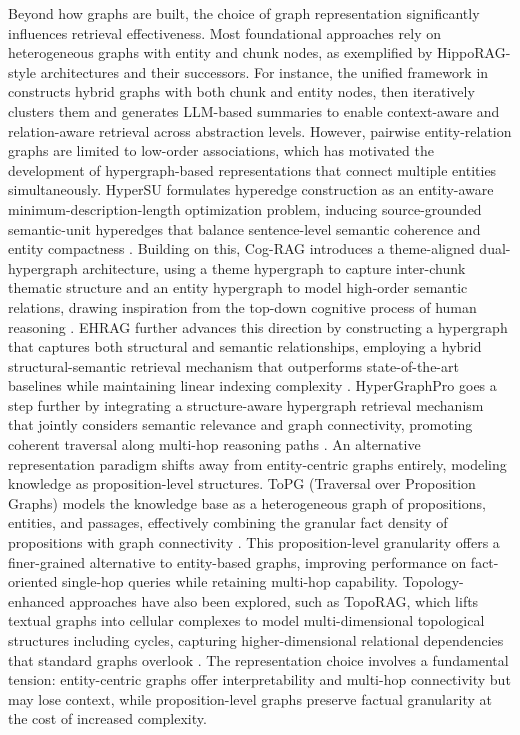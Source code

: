 \documentclass[11pt]{article}
\begin{document}
Beyond how graphs are built, the choice of graph representation significantly influences retrieval effectiveness. Most foundational approaches rely on heterogeneous graphs with entity and chunk nodes, as exemplified by HippoRAG-style architectures and their successors. For instance, the unified framework in \cite{ref289} constructs hybrid graphs with both chunk and entity nodes, then iteratively clusters them and generates LLM-based summaries to enable context-aware and relation-aware retrieval across abstraction levels. However, pairwise entity-relation graphs are limited to low-order associations, which has motivated the development of hypergraph-based representations that connect multiple entities simultaneously. HyperSU formulates hyperedge construction as an entity-aware minimum-description-length optimization problem, inducing source-grounded semantic-unit hyperedges that balance sentence-level semantic coherence and entity compactness \cite{ref290}. Building on this, Cog-RAG introduces a theme-aligned dual-hypergraph architecture, using a theme hypergraph to capture inter-chunk thematic structure and an entity hypergraph to model high-order semantic relations, drawing inspiration from the top-down cognitive process of human reasoning \cite{ref291}. EHRAG further advances this direction by constructing a hypergraph that captures both structural and semantic relationships, employing a hybrid structural-semantic retrieval mechanism that outperforms state-of-the-art baselines while maintaining linear indexing complexity \cite{ref292}. HyperGraphPro goes a step further by integrating a structure-aware hypergraph retrieval mechanism that jointly considers semantic relevance and graph connectivity, promoting coherent traversal along multi-hop reasoning paths \cite{ref293}. An alternative representation paradigm shifts away from entity-centric graphs entirely, modeling knowledge as proposition-level structures. ToPG (Traversal over Proposition Graphs) models the knowledge base as a heterogeneous graph of propositions, entities, and passages, effectively combining the granular fact density of propositions with graph connectivity \cite{ref294}. This proposition-level granularity offers a finer-grained alternative to entity-based graphs, improving performance on fact-oriented single-hop queries while retaining multi-hop capability. Topology-enhanced approaches have also been explored, such as TopoRAG, which lifts textual graphs into cellular complexes to model multi-dimensional topological structures including cycles, capturing higher-dimensional relational dependencies that standard graphs overlook \cite{ref295}. The representation choice involves a fundamental tension: entity-centric graphs offer interpretability and multi-hop connectivity but may lose context, while proposition-level graphs preserve factual granularity at the cost of increased complexity.
\end{document}
